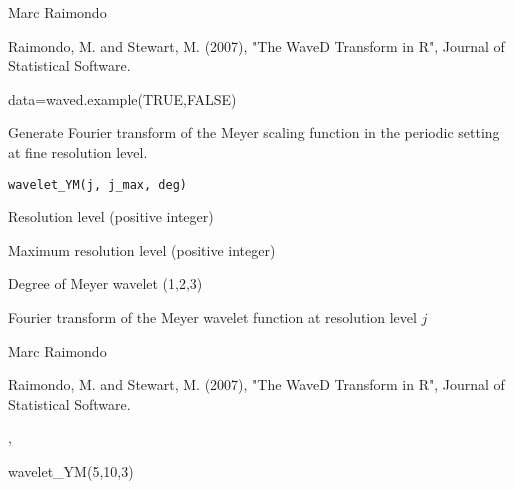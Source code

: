 \documentclass{article}
\begin{document}
\begin{Author}\relax
Marc Raimondo
\end{Author}
\begin{References}\relax
Raimondo, M. and Stewart, M. (2007),
"The WaveD Transform in R", Journal of Statistical Software.
\end{References}
\begin{SeeAlso}\relax
{}
\end{SeeAlso}
\begin{Examples}
\begin{ExampleCode} 
data=waved.example(TRUE,FALSE)
\end{ExampleCode}
\end{Examples}

\begin{Description}\relax
Generate Fourier transform  of the Meyer scaling function in the periodic setting
at fine resolution level.
\end{Description}
\begin{Usage}
\begin{verbatim}
wavelet_YM(j, j_max, deg)
\end{verbatim}
\end{Usage}
\begin{Arguments}
\begin{ldescription}
\item[\code{j}] Resolution level (positive integer) 
\item[\code{j\_max}] Maximum resolution level (positive integer)
\item[\code{deg}] Degree of Meyer wavelet (1,2,3) 
\end{ldescription}
\end{Arguments}
\begin{Value}
Fourier transform  of the Meyer wavelet function at resolution level $j$
\end{Value}
\begin{Author}\relax
Marc Raimondo
\end{Author}
\begin{References}\relax
Raimondo, M. and Stewart, M. (2007),
"The WaveD Transform in R", Journal of Statistical Software.
\end{References}
\begin{SeeAlso}\relax
{},
\end{SeeAlso}
\begin{Examples}
\begin{ExampleCode}
wavelet_YM(5,10,3)
\end{ExampleCode}
\end{Examples}
\end{document}

